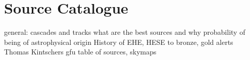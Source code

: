 \chapter{Source Catalogue}
general: cascades and tracks
what are the best sources and why
probability of being of astrophysical origin
History of EHE, HESE to bronze, gold alerts Thomas Kintschers gfu
table of sources, skymaps
